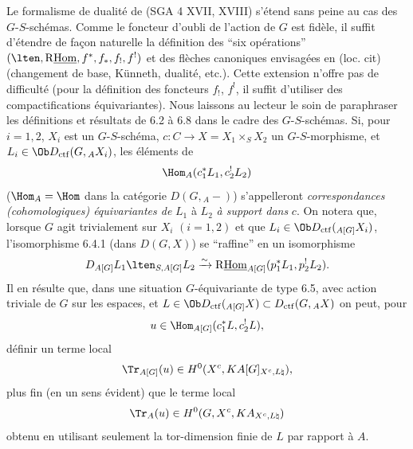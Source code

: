 Le formalisme de dualité de (SGA 4 XVII, XVIII) s'étend sans peine au cas des $G$-$S$-schémas. Comme le foncteur d'oubli de l'action de $G$ est fidèle, il suffit d'étendre de façon naturelle la définition des ``six opérations'' $(\lten,\mathrm{R}\underline{\mathrm{Hom}},f^*,f_*,f_!,f^!)$ et des flèches canoniques envisagées en (loc. cit) (changement de base, Künneth, dualité, etc.). Cette extension n'offre pas de difficulté (pour la définition des foncteurs $f_!$, $f^!$, il suffit d'utiliser des compactifications équivariantes). Nous laissons au lecteur le soin de paraphraser les définitions et résultats de 6.2 à 6.8 dans le cadre des $G$-$S$-schémas. Si, pour $i=1,2$, $X_i$ est un $G$-$S$-schéma, $c:C\to X=X_1\times_SX_2$ un $G$-$S$-morphisme, et $L_i\in\Ob D_{\mathrm{ctf}}(G,{}_AX_i)$, les éléments de
\[
\Hom_A(c_1^*L_1,c_2^!L_2)
\]
($\Hom_A=\Hom$ dans la catégorie $D(G,{}_A-)$) s'appelleront \emph{correspondances (cohomologiques) équivariantes de} $L_1$ à $L_2$ \emph{à support dans} $c$. On notera que, lorsque $G$ agit trivialement sur $X_i$ $(i=1,2)$ et que $L_i\in\Ob D_{\mathrm{ctf}}({}_{A[G]}X_i)$, l'isomorphisme 6.4.1 (dans $D(G,X)$) se ``raffine'' en un isomorphisme
\[
D_{A[G]}L_1\lten_{S,A[G]}L_2
\xrightarrow{\sim}
\mathrm{R}\underline{\mathrm{Hom}}_{A[G]}(p_1^*L_1,p_2^!L_2).
\]
Il en résulte que, dans une situation $G$-équivariante de type 6.5, avec action triviale de $G$ sur les espaces, et $L\in\Ob D_{\mathrm{ctf}}({}_{A[G]}X)\subset D_{\mathrm{ctf}}(G,{}_AX)$ on peut, pour
\[
u\in\Hom_{A[G]}(c_1^*L,c_2^!L),
\]
définir un terme local
\[
\Tr_{A[G]}(u)\in H^0(X^c,KA[G]_{X^c,L\natural}),
\]
plus fin (en un sens évident) que le terme local
\[
\Tr_A(u)\in H^0(G,X^c,KA_{X^c,L\natural})
\]
obtenu en utilisant seulement la tor-dimension finie de $L$ par rapport à $A$.

